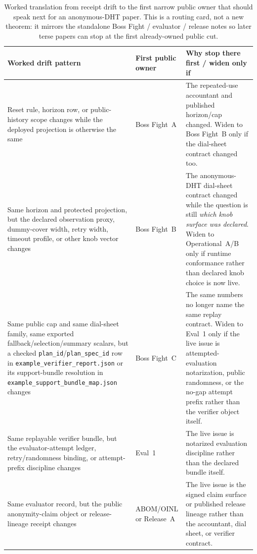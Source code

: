 \documentclass[11pt]{article}
\begin{document}
\begin{table}[t]
\centering
\small
\begin{tabularx}{\linewidth}{@{}Y Y Y@{}}
\toprule
Worked drift pattern & First public owner & Why stop there first / widen only if \\
\midrule
Reset rule, horizon row, or public-history scope changes while the deployed projection is otherwise the same & Boss Fight~A & The repeated-use accountant and published horizon/cap changed. Widen to Boss Fight~B only if the dial-sheet contract changed too. \\
Same horizon and protected projection, but the declared observation proxy, dummy-cover width, retry width, timeout profile, or other knob vector changes & Boss Fight~B & The anonymous-DHT dial-sheet contract changed while the question is still \emph{which knob surface was declared}. Widen to Operational~A/B only if runtime conformance rather than declared knob choice is now live. \\
Same public cap and same dial-sheet family, same exported fallback/selection/summary scalars, but a checked \texttt{plan\_id}/\texttt{plan\_spec\_id} row in \texttt{example\_verifier\_report.json} or its support-bundle resolution in \texttt{example\_support\_bundle\_map.json} changes & Boss Fight~C & The same numbers no longer name the same replay contract. Widen to Eval~1 only if the live issue is attempted-evaluation notarization, public randomness, or the no-gap attempt prefix rather than the verifier object itself. \\
Same replayable verifier bundle, but the evaluator-attempt ledger, retry/randomness binding, or attempt-prefix discipline changes & Eval~1 & The live issue is notarized evaluation discipline rather than the declared bundle itself. \\
Same evaluator record, but the public anonymity-claim object or release-lineage receipt changes & ABOM/OINL or Release~A & The live issue is the signed claim surface or published release lineage rather than the accountant, dial sheet, or verifier contract. \\
\bottomrule
\end{tabularx}
\caption{Worked translation from receipt drift to the first narrow public owner that should speak next for an anonymous-DHT paper. This is a routing card, not a new theorem: it mirrors the standalone Boss Fight / evaluator / release notes so later terse papers can stop at the first already-owned public cut.}
\label{tab:workedexample-anondht-cutover-card}
\end{table}
\end{document}
